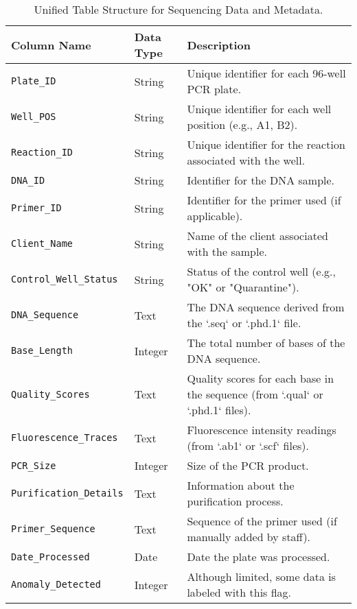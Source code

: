 \begin{table}[H]
  \centering
  \begin{tabular}{|l|l|p{8cm}|}
    \hline
    \textbf{Column Name} & \textbf{Data Type} & \textbf{Description} \\ \hline
    \texttt{Plate\_ID} & String & Unique identifier for each 96-well PCR plate. \\ \hline
    \texttt{Well\_POS} & String & Unique identifier for each well position (e.g., A1, B2). \\ \hline
    \texttt{Reaction\_ID} & String & Unique identifier for the reaction associated with the well. \\ \hline
    \texttt{DNA\_ID} & String & Identifier for the DNA sample. \\ \hline
    \texttt{Primer\_ID} & String & Identifier for the primer used (if applicable). \\ \hline
    \texttt{Client\_Name} & String & Name of the client associated with the sample. \\ \hline
    \texttt{Control\_Well\_Status} & String & Status of the control well (e.g., "OK" or "Quarantine"). \\ \hline
    \texttt{DNA\_Sequence} & Text & The DNA sequence derived from the `.seq` or `.phd.1` file. \\ \hline
    \texttt{Base\_Length} & Integer & The total number of bases of the DNA sequence. \\ \hline
    \texttt{Quality\_Scores} & Text & Quality scores for each base in the sequence (from `.qual` or `.phd.1` files). \\ \hline
    \texttt{Fluorescence\_Traces} & Text & Fluorescence intensity readings (from `.ab1` or `.scf` files). \\ \hline
    \texttt{PCR\_Size} & Integer & Size of the PCR product. \\ \hline
    \texttt{Purification\_Details} & Text & Information about the purification process. \\ \hline
    \texttt{Primer\_Sequence} & Text & Sequence of the primer used (if manually added by staff). \\ \hline
    \texttt{Date\_Processed} & Date & Date the plate was processed. \\ \hline
    \texttt{Anomaly\_Detected} & Integer & Although limited, some data is labeled with this flag. \\ \hline
  \end{tabular}
  \caption{Unified Table Structure for Sequencing Data and Metadata.}
  \label{tab:unified_table}
\end{table}

